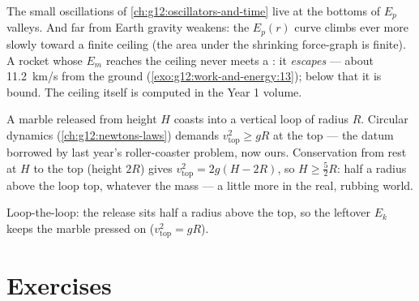 \begin{remark}\label{rem:g12:work-and-energy:escape}
The small oscillations of \cref{ch:g12:oscillators-and-time} live at
the bottoms of $E_p$ valleys. And far from Earth gravity weakens: the
$E_p(r)$ curve climbs ever more slowly toward a finite ceiling (the
area under the shrinking force-graph is finite). A rocket whose $E_m$
reaches the ceiling never meets a : it
\emph{escapes} --- about \qty{11.2}{km/s} from
the ground (\cref{exo:g12:work-and-energy:13}); below that it is
bound. The ceiling itself is computed in the Year 1 volume.
\end{remark}

\begin{example}\label{ex:g12:work-and-energy:loop}
A marble released from height $H$ coasts into a vertical loop of
radius $R$. Circular dynamics (\cref{ch:g12:newtons-laws}) demands
$v_{\text{top}}^2 \geq gR$ at the top --- the datum borrowed by last
year's roller-coaster problem, now ours. Conservation from rest at $H$
to the top (height $2R$) gives $v_{\text{top}}^2 = 2g(H - 2R)$, so
$H \geq \tfrac52 R$: half a radius above the loop top, whatever the
mass --- a little more in the real, rubbing world.
\end{example}

\begin{omfigure}

{\small Loop-the-loop: the release sits half a radius above the top,
so the leftover $E_k$ keeps the marble pressed on ($v_{\text{top}}^2 = gR$).}
\end{omfigure}

\section{Exercises}

